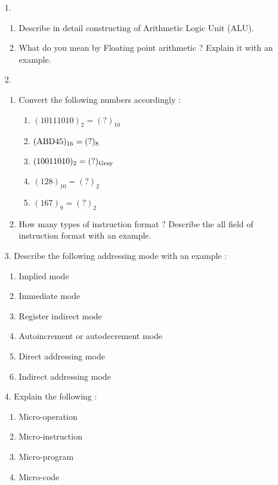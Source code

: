 \documentclass[12pt]{article}
\begin{document}
\begin{enumerate}

	\item[1.]
	\begin{enumerate}
		\item Describe in detail constructing of Arithmetic Logic Unit (ALU).
		\item What do you mean by Floating point arithmetic ? Explain it with an example.
	\end{enumerate}

	\item[2.]
	\begin{enumerate}
		\item Convert the following numbers accordingly :
			\begin{enumerate}
				\item $(10111010)_2 = (?)_{10}$
				\item $(\textnormal{ABD}45)_{16} = (?)_8$
				\item $(10011010)_2 = (?)_{\textnormal{Gray}}$
				\item $(128)_{10} = (?)_2$
				\item $(167)_9 = (?)_2$
			\end{enumerate}
		\item How many types of instruction format ? Describe the all field of instruction format with an example.
	\end{enumerate}

	\item[3.] Describe the following addressing mode with an example :
	\begin{enumerate}
		\item Implied mode
		\item Immediate mode
		\item Register indirect mode
		\item Autoincrement or autodecrement mode
		\item Direct addressing mode
		\item Indirect addressing mode
	\end{enumerate}

	\item[4.] Explain the following :
	\begin{enumerate}
		\item Micro-operation
		\item Micro-instruction
		\item Micro-program
		\item Micro-code
	\end{enumerate}


\end{enumerate}
\end{document}
